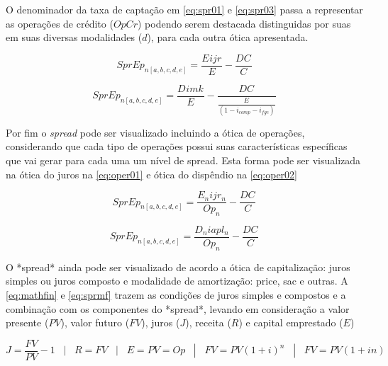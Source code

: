 \documentclass[
  12pt,
  12pt,
  openright,
  oneside,
  a4paper,
  chapter=TITLE,
  section=TITLE,
  subsection=TITLE,
  subsubsection=TITLE,
  english,
  portugues,
  sumario=tradicional]{abntex2}
\begin{document}
\begin{apendicesenv}
O denominador da taxa de captação em \autoref{eq:spr01} e \autoref{eq:spr03} passa a representar as operações de  crédito ($OpCr$) podendo serem destacada distinguidas por suas em  suas diversas  modalidades ($d$), para cada outra ótica apresentada. 


\begin{equation}\label{eq:spr01}
SprEp_{n[a,b,c,d,e]} =  \frac{E_{}ijr_{}}{E} - \frac{DC_{} }{C}
\end{equation}



\begin{equation}\label{eq:spr03}
SprEp_{n[a,b,c,d,e]} =  \frac{D_{}imk_{}}{E} - \frac{DC_{}}{\frac{E_{}}{(1 - i_{comp} - i_{fgc})}}
\end{equation}




Por fim o \emph{spread} pode ser visualizado incluindo a ótica de operações, considerando que cada tipo de operações possui suas características específicas que vai gerar para cada uma um nível de spread. Esta forma pode ser visualizada na ótica do juros na \autoref{eq:oper01} e ótica do dispêndio na \autoref{eq:oper02}  


\begin{equation}\label{eq:oper01}
SprEp_{n[a,b,c,d,e]} =  \frac{E_{n}ijr_{n}}{Op_{n}} - \frac{DC_{} }{C}
\end{equation}



\begin{equation}\label{eq:oper02}
SprEp_{n[a,b,c,d,e]} =  \frac{D_{n}iapl_{n}}{Op_{n}} - \frac{DC_{} }{C}
\end{equation}


O *spread* ainda pode ser visualizado de acordo a ótica de capitalização: juros simples ou juros composto e modalidade de amortização: price, sac e outras. A \autoref{eq:mathfin} e \autoref{eq:sprmf} trazem as condições de juros simples e compostos e a combinação com os componentes do *spread*, levando em consideração a valor presente ($PV$), valor futuro ($FV$), juros ($J$), receita ($R$) e capital emprestado ($E$) 



\begin{equation}\label{eq:mathfin}
J = \frac{FV}{PV} - 1  \hspace{10pt} | \hspace{10pt} R = FV \hspace{10pt} | \hspace{10pt} E = PV = Op \hspace{10pt} | \hspace{10pt}  FV = PV(1 + i)^n  \hspace{10pt} |   \hspace{10pt} FV = PV(1 + i n)
\end{equation}





\end{apendicesenv}
\end{document}
